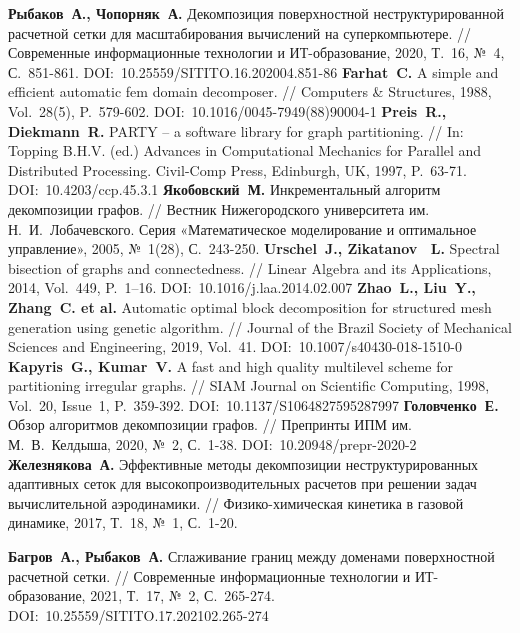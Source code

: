 \begin{thebibliography}{99}
%
\textbf{Рыбаков~А., Чопорняк~А.} Декомпозиция поверхностной неструктурированной расчетной сетки для масштабирования вычислений на суперкомпьютере. // Современные информационные технологии и ИТ-образование, 2020, Т.~16, №~4, С.~851-861. DOI:~10.25559/SITITO.16.202004.851-86
%
\textbf{Farhat~C.} A simple and efficient automatic fem domain decomposer. // Computers \& Structures, 1988, Vol.~28(5), P.~579-602. DOI:~10.1016/0045-7949(88)90004-1
%
\textbf{Preis~R., Diekmann~R.} PARTY -- a software library for graph partitioning. // In: Topping B.H.V. (ed.) Advances in Computational Mechanics for Parallel and Distributed Processing. Civil-Comp Press, Edinburgh, UK, 1997, P.~63-71. DOI:~10.4203/ccp.45.3.1 
%
\textbf{Якобовский~М.} Инкрементальный алгоритм декомпозиции графов. // Вестник Нижегородского университета им. Н.~И.~Лобачевского. Серия «Математическое моделирование и оптимальное управление», 2005, №~1(28), С.~243-250.
%
\textbf{Urschel~J., Zikatanov~ L.} Spectral bisection of graphs and connectedness. // Linear Algebra and its Applications, 2014, Vol.~449, P.~1–16. DOI:~10.1016/j.laa.2014.02.007
%
\textbf{Zhao~L., Liu~Y., Zhang~C. et al.} Automatic optimal block decomposition for structured mesh generation using genetic algorithm. // Journal of the Brazil Society of Mechanical Sciences and Engineering, 2019, Vol.~41. DOI:~10.1007/s40430-018-1510-0
%
\textbf{Kapyris~G., Kumar~V.} A fast and high quality multilevel scheme for partitioning irregular graphs. // SIAM Journal on Scientific Computing, 1998, Vol.~20, Issue~1, P.~359-392. DOI:~10.1137/S1064827595287997
%
\textbf{Головченко~Е.} Обзор алгоритмов декомпозиции графов. // Препринты ИПМ им. М.~В.~Келдыша, 2020, №~2, С.~1-38. DOI:~10.20948/prepr-2020-2
%
\textbf{Железнякова~А.} Эффективные методы декомпозиции неструктурированных адаптивных сеток для высокопроизводительных расчетов при решении задач вычислительной аэродинамики. // Физико-химическая кинетика в газовой динамике, 2017, Т.~18, №~1, С.~1-20.
%



%
\textbf{Багров~А., Рыбаков~А.} Сглаживание границ между доменами поверхностной расчетной сетки. // Современные информационные технологии и ИТ-образование, 2021, Т.~17, №~2, С.~265-274. DOI:~10.25559/SITITO.17.202102.265-274
%




\end{thebibliography}
